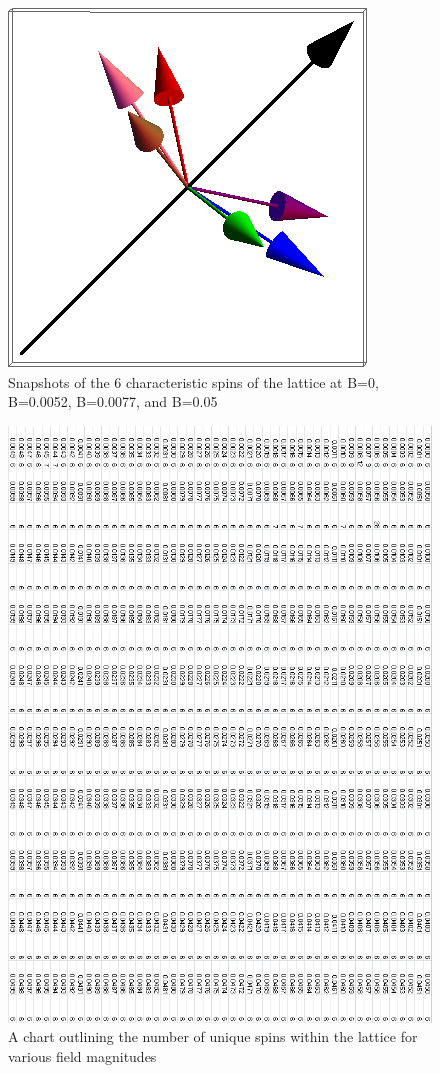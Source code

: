 \documentclass{article}
\begin{document}
\begin{figure}[ht]
\includegraphics[scale=0.3]{111_2000/4S000to005G.png}
\caption{Snapshots of the 6 characteristic spins of the lattice at B=0, B=0.0052, B=0.0077, and B=0.05}
\end{figure}

\begin{center}
\begin{figure}
  \includegraphics[keepaspectratio,scale=0.58]{111_2000/000to005SpinChart.png}
  \caption{A chart outlining the number of unique spins within the lattice for various field magnitudes}
\end{figure}
\end{center}
\end{document}

